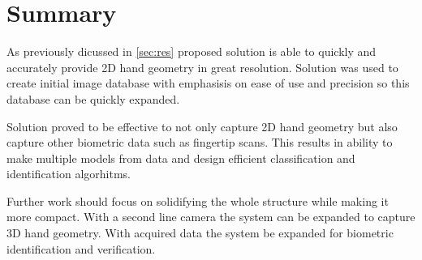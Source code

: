 \documentclass[11pt,a4paper]{article}
\begin{document}
\section{Summary}
\label{sec:sum}
As previously dicussed in \ref{sec:res} proposed solution is able to quickly and accurately provide 2D hand geometry in great resolution. Solution was
used to create initial image database with emphasisis on ease of use and precision so this database can be quickly expanded.

Solution proved to be effective to not only capture 2D hand geometry but also capture other biometric data such as fingertip scans. This results in
ability to make multiple models from data and design efficient classification and identification algorhitms.

Further work should focus on solidifying the whole structure while making it more compact. With a second line camera the system can be expanded to capture 3D hand geometry. With acquired data the system be expanded for biometric identification and verification.
\end{document}
